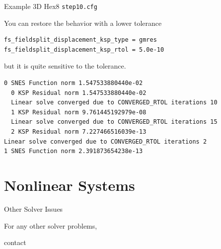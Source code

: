\documentclass[dvipsnames]{beamer}
\begin{document}
\begin{frame}[fragile]{Example 3D Hex8 \texttt{step10.cfg}}

\begin{block}{You can restore the behavior with a lower tolerance}
\begin{verbatim}
fs_fieldsplit_displacement_ksp_type = gmres
fs_fieldsplit_displacement_ksp_rtol = 5.0e-10
\end{verbatim}
but it is quite sensitive to the tolerance.
{\scriptsize
\begin{verbatim}
0 SNES Function norm 1.547533880440e-02 
  0 KSP Residual norm 1.547533880440e-02 
  Linear solve converged due to CONVERGED_RTOL iterations 10
  1 KSP Residual norm 9.761445192979e-08 
  Linear solve converged due to CONVERGED_RTOL iterations 15
  2 KSP Residual norm 7.227466516039e-13 
Linear solve converged due to CONVERGED_RTOL iterations 2
1 SNES Function norm 2.391873654238e-13 
\end{verbatim}
}
\end{block}
\end{frame}
%
%
\section{Nonlinear Systems}
%
  
  
  
  
  
%
\begin{frame}{Other Solver Issues}
\begin{center}\Huge
For any other solver problems,
\end{center}
\bigskip
\begin{center}\Huge
contact 
\end{center}
\end{frame}
\end{document}
